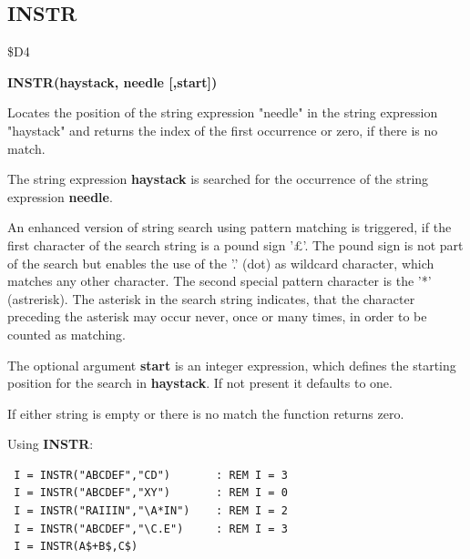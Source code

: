 \subsection{INSTR}
\begin{description}[leftmargin=2cm,style=nextline]
\item [Token:] \$D4
\item [Format:] {\bf INSTR(haystack, needle [,start])}
\item [Usage:] Locates the
               position of the string expression "needle"
               in the string expression "haystack" and
               returns the index of the first occurrence
               or zero, if there is no match.

               The string expression {\bf haystack}
               is searched for the occurrence of the
               string expression
               {\bf needle}.

               An enhanced version of string search using pattern
               matching is triggered, if the first character of
               the search string is a pound sign '£'.
               The pound sign is not part of the search but enables the use
               of the '.' (dot) as wildcard character, which matches any
               other character. The second special pattern character is
               the '*' (astrerisk). The asterisk in the search string indicates,
               that the character preceding the asterisk may occur
               never, once or many times, in order to be counted as matching.

               The optional argument {\bf start} is an integer
               expression, which defines the starting position
               for the search in {\bf haystack}. If not present
               it defaults to one.

\item [Remarks:] If either string is empty or there is no match
               the function returns zero.

\item [Example:] Using {\bf INSTR}:
\begin{tcolorbox}[colback=black,coltext=white]
\verbatimfont{\codefont}
\begin{verbatim}
 I = INSTR("ABCDEF","CD")       : REM I = 3
 I = INSTR("ABCDEF","XY")       : REM I = 0
 I = INSTR("RAIIIN","\A*IN")    : REM I = 2
 I = INSTR("ABCDEF","\C.E")     : REM I = 3
 I = INSTR(A$+B$,C$)
\end{verbatim}
\end{tcolorbox}
\end{description}

